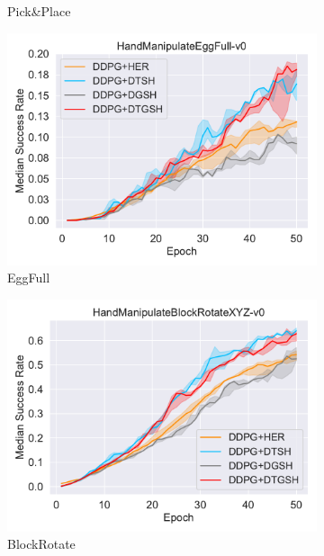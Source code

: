 \begin{figure}[h]
\begin{subfigure}[t]{0.33\textwidth}
    \caption{Pick\&Place}
    \label{subfig:baseline_pick_ab1}
  \end{subfigure}\hfill
  \begin{subfigure}[t]{0.33\textwidth}
    \includegraphics[width=\textwidth]{figures/chapter4/HandManipulateEggFull-v0_ab1.pdf}
    \caption{EggFull}
    \label{subfig:baseline_handegg_ab1}
  \end{subfigure}\hfill
  \begin{subfigure}[t]{0.33\textwidth}
    \includegraphics[width=\textwidth]{figures/chapter4/HandManipulateBlockRotateXYZ-v0_ab1.pdf}
    \caption{BlockRotate}
    \label{subfig:baseline_handblock_ab1}
  \end{subfigure}\hfill
  \begin{subfigure}[t]{0.33\textwidth}

\end{subfigure}
\end{figure}
